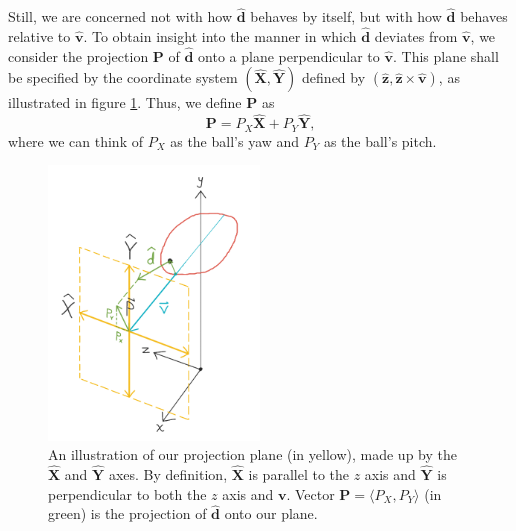 \documentclass{article}
\begin{document}
Still, we are concerned not with how $\mathbf{\hat{d}}$ behaves by itself, but with how $\mathbf{\hat{d}}$ behaves relative to $\mathbf{\hat{v}}$. To obtain insight into the manner in which $\mathbf{\hat{d}}$ deviates from $\mathbf{\hat{v}}$, we consider the projection $\mathbf{P}$ of $\mathbf{\hat{d}}$ onto a plane perpendicular to $\mathbf{\hat{v}}$. This plane shall be specified by the coordinate system $(\mathbf{\hat{X}}, \mathbf{\hat{Y}})$ defined by $(\mathbf{\hat{z}}, \mathbf{\hat{z}} \times \mathbf{\hat{v}})$, as illustrated in figure \ref{projection}. Thus, we define $\mathbf{P}$ as
\begin{equation}
    \mathbf{P} = P_X \mathbf{\hat{X}} + P_Y \mathbf{\hat{Y}}\text{,}
\end{equation}
where we can think of $P_X$ as the ball's yaw and $P_Y$ as the ball's pitch.

\begin{figure}[h]
\centering
    \includegraphics[width=0.5\textwidth]{img/projection.png}
    \caption{An illustration of our projection plane (in yellow), made up by the $\mathbf{\hat{X}}$ and $\mathbf{\hat{Y}}$ axes. By definition, $\mathbf{\hat{X}}$ is parallel to the $z$ axis and $\mathbf{\hat{Y}}$ is perpendicular to both the $z$ axis and $\mathbf{v}$. Vector $\mathbf{P} = \langle P_X, P_Y \rangle$ (in green) is the projection of $\mathbf{\hat{d}}$ onto our plane.}
    \label{projection}
\end{figure}
\end{document}
